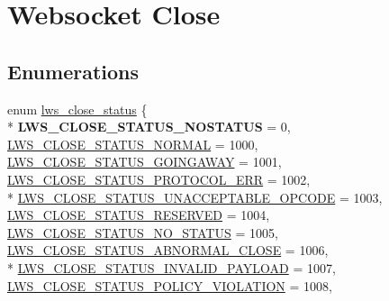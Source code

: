 \hypertarget{group__wsclose}{}\section{Websocket Close}
\label{group__wsclose}
\subsection*{Enumerations}
\begin{DoxyCompactItemize}
\item 
enum \hyperlink{group__wsclose_gae399c571df32ba532c0ca67da9284985}{lws\+\_\+close\+\_\+status} \{ \\*
{\bfseries L\+W\+S\+\_\+\+C\+L\+O\+S\+E\+\_\+\+S\+T\+A\+T\+U\+S\+\_\+\+N\+O\+S\+T\+A\+T\+US} = 0, 
\hyperlink{group__wsclose_ggae399c571df32ba532c0ca67da9284985a3ffa38d5081b85fb739e02a747ccf2c4}{L\+W\+S\+\_\+\+C\+L\+O\+S\+E\+\_\+\+S\+T\+A\+T\+U\+S\+\_\+\+N\+O\+R\+M\+AL} = 1000, 
\hyperlink{group__wsclose_ggae399c571df32ba532c0ca67da9284985a9737a68759e739856b150ff9dfa30218}{L\+W\+S\+\_\+\+C\+L\+O\+S\+E\+\_\+\+S\+T\+A\+T\+U\+S\+\_\+\+G\+O\+I\+N\+G\+A\+W\+AY} = 1001, 
\hyperlink{group__wsclose_ggae399c571df32ba532c0ca67da9284985a1bb501d212fa4d57053db681b1dfab98}{L\+W\+S\+\_\+\+C\+L\+O\+S\+E\+\_\+\+S\+T\+A\+T\+U\+S\+\_\+\+P\+R\+O\+T\+O\+C\+O\+L\+\_\+\+E\+RR} = 1002, 
\\*
\hyperlink{group__wsclose_ggae399c571df32ba532c0ca67da9284985a462c99b05459df700919cfd3f53c8276}{L\+W\+S\+\_\+\+C\+L\+O\+S\+E\+\_\+\+S\+T\+A\+T\+U\+S\+\_\+\+U\+N\+A\+C\+C\+E\+P\+T\+A\+B\+L\+E\+\_\+\+O\+P\+C\+O\+DE} = 1003, 
\hyperlink{group__wsclose_ggae399c571df32ba532c0ca67da9284985af90cb98d983ad3d4c79df9b6f3d4a4d2}{L\+W\+S\+\_\+\+C\+L\+O\+S\+E\+\_\+\+S\+T\+A\+T\+U\+S\+\_\+\+R\+E\+S\+E\+R\+V\+ED} = 1004, 
\hyperlink{group__wsclose_ggae399c571df32ba532c0ca67da9284985a4b8a3b7ce6f731e5248e4b0fb64a5044}{L\+W\+S\+\_\+\+C\+L\+O\+S\+E\+\_\+\+S\+T\+A\+T\+U\+S\+\_\+\+N\+O\+\_\+\+S\+T\+A\+T\+US} = 1005, 
\hyperlink{group__wsclose_ggae399c571df32ba532c0ca67da9284985a68b3d34bebd88547dcfa5cadba0acd6c}{L\+W\+S\+\_\+\+C\+L\+O\+S\+E\+\_\+\+S\+T\+A\+T\+U\+S\+\_\+\+A\+B\+N\+O\+R\+M\+A\+L\+\_\+\+C\+L\+O\+SE} = 1006, 
\\*
\hyperlink{group__wsclose_ggae399c571df32ba532c0ca67da9284985a7aef2da0062da606eeb35aaca5cf9050}{L\+W\+S\+\_\+\+C\+L\+O\+S\+E\+\_\+\+S\+T\+A\+T\+U\+S\+\_\+\+I\+N\+V\+A\+L\+I\+D\+\_\+\+P\+A\+Y\+L\+O\+AD} = 1007, 
\hyperlink{group__wsclose_ggae399c571df32ba532c0ca67da9284985ad09e68295eabdddcba4e332fbea70ae5}{L\+W\+S\+\_\+\+C\+L\+O\+S\+E\+\_\+\+S\+T\+A\+T\+U\+S\+\_\+\+P\+O\+L\+I\+C\+Y\+\_\+\+V\+I\+O\+L\+A\+T\+I\+ON} = 1008, 

\end{DoxyCompactItemize}
